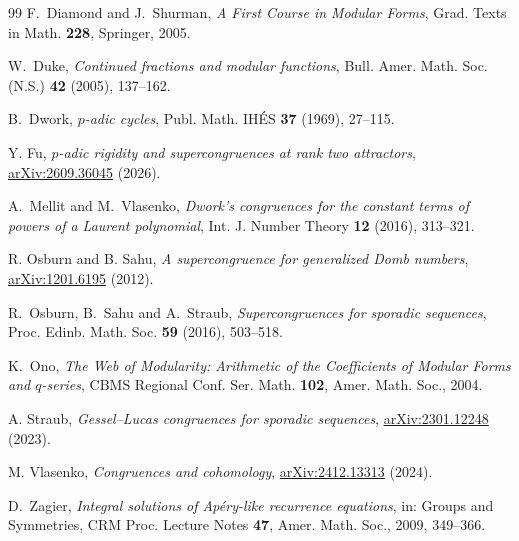 \documentclass[11pt,a4paper]{article}
\theoremstyle{definition}\newtheorem{definition}[theorem]{Definition}
\theoremstyle{remark}\newtheorem{remark}[theorem]{Remark}
\numberwithin{equation}{section}
\begin{document}
\begin{thebibliography}{99}
F.~Diamond and J.~Shurman, \emph{A First Course in Modular Forms}, Grad. Texts in
Math. \textbf{228}, Springer, 2005.

W.~Duke, \emph{Continued fractions and modular functions}, Bull. Amer. Math. Soc. (N.S.)
\textbf{42} (2005), 137--162.

B.~Dwork, \emph{$p$-adic cycles}, Publ. Math. IH\'ES \textbf{37} (1969), 27--115.

Y. Fu, \emph{$p$-adic rigidity and supercongruences at rank two attractors},
\href{https://arxiv.org/abs/2609.36045}{arXiv:2609.36045} (2026).

A.~Mellit and M.~Vlasenko, \emph{Dwork's congruences for the constant terms of powers
of a Laurent polynomial}, Int. J. Number Theory \textbf{12} (2016), 313--321.

R. Osburn and B. Sahu, \emph{A supercongruence for generalized Domb numbers},
\href{https://arxiv.org/abs/1201.6195}{arXiv:1201.6195} (2012).

R.~Osburn, B.~Sahu and A.~Straub, \emph{Supercongruences for sporadic sequences},
Proc. Edinb. Math. Soc. \textbf{59} (2016), 503--518.

K.~Ono, \emph{The Web of Modularity: Arithmetic of the Coefficients of Modular Forms
and $q$-series}, CBMS Regional Conf. Ser. Math. \textbf{102}, Amer. Math. Soc., 2004.

A. Straub, \emph{Gessel--Lucas congruences for sporadic sequences},
\href{https://arxiv.org/abs/2301.12248}{arXiv:2301.12248} (2023).

M. Vlasenko, \emph{Congruences and cohomology},
\href{https://arxiv.org/abs/2412.13313}{arXiv:2412.13313} (2024).

D.~Zagier, \emph{Integral solutions of Ap\'ery-like recurrence equations}, in: Groups
and Symmetries, CRM Proc. Lecture Notes \textbf{47}, Amer. Math. Soc., 2009, 349--366.

\end{thebibliography}
\end{document}

